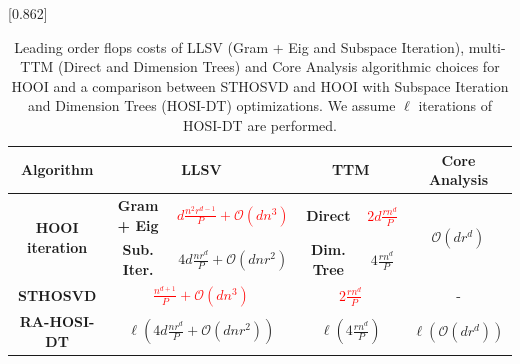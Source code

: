 \begin{table}
    \scalebox{0.862}[0.862]{
        \begin{tabular}{c|c|c|c|c|c}
            \bf Algorithm & \multicolumn{2}{|c|}{\bf LLSV} & \multicolumn{2}{|c|}{\bf TTM} & \bf Core Analysis\\ \hline\hline
            \multirow{2}{*}{\bf HOOI iteration} & \bf Gram + Eig & \textcolor{red}{$d\frac{n^2r^{d-1}}{P} + \mathcal{O}(dn^3)$} & \bf Direct & \textcolor{red}{$2d\frac{rn^d}{P}$} & \multirow{2}{*}{$\mathcal{O}(dr^d)$}\\\cline{2-5}
            & \bf Sub. Iter. & $4d\frac{nr^d}{P} + \mathcal{O}(dnr^2)$ & \bf Dim. Tree & $4\frac{rn^d}{P}$\\\hline\hline
            \bf STHOSVD & \multicolumn{2}{|c|}{\textcolor{red}{$\frac{n^{d+1}}{P} + \mathcal{O}(dn^3)$}} & \multicolumn{2}{|c|}{\textcolor{red}{$2\frac{rn^d}{P}$}} & -\\\hline
            \bf RA-HOSI-DT & \multicolumn{2}{|c|}{$\ell\left(4d\frac{nr^d}{P} + \mathcal{O}(dnr^2)\right)$} & \multicolumn{2}{|c|}{$\ell\left(4\frac{rn^d}{P}\right)$} & $\ell \left(\mathcal{O}(dr^d)\right)$\\\hline
        \end{tabular}
    }
    \caption{Leading order flops costs of LLSV (Gram + Eig and Subspace Iteration), multi-TTM (Direct and Dimension Trees) and Core Analysis algorithmic choices for HOOI and a comparison between STHOSVD and HOOI with Subspace Iteration and Dimension Trees (HOSI-DT) optimizations. We assume $\ell$ iterations of HOSI-DT are performed.}
    \label{tab:flops}
\end{table}

